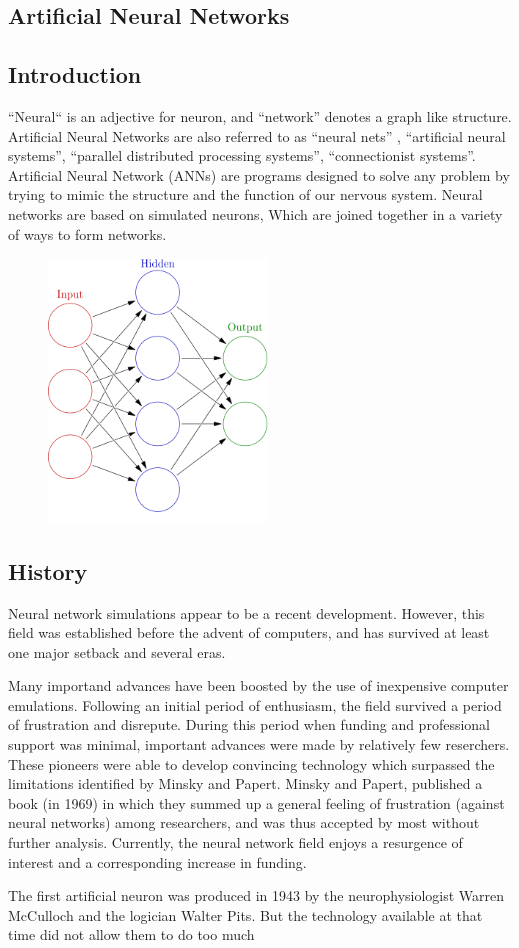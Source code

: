 \documentclass[12pt,times,a4paper]{report}
\begin{document}
{{\begin{normalsize}
\chapter{\fontsize{16}{14}\textbf{Artificial Neural Networks\hfill}}
\section{Introduction}
\par
“Neural“ is an adjective for neuron, and “network” denotes a graph like structure.
Artificial Neural Networks are also referred to as “neural nets” , “artificial neural systems”, “parallel distributed processing systems”, “connectionist systems”.
Artificial Neural Network (ANNs) are programs designed to solve any problem by trying to mimic the structure and the function of our nervous system.
Neural networks are based on simulated neurons, Which are joined together in a variety of ways to form networks.
\begin{figure}[H]
\includegraphics[height=7cm,center]{neural.png}
\caption{}
\end{figure}
\newpage
\section{History}
Neural network simulations appear to be a recent development. However, this field was
established before the advent of computers, and has survived at least one major setback and
several eras. 
\par
Many importand advances have been boosted by the use of inexpensive computer emulations.
Following an initial period of enthusiasm, the field survived a period of frustration and disrepute.
During this period when funding and professional support was minimal, important advances
were made by relatively few reserchers. These pioneers were able to develop convincing
technology which surpassed the limitations identified by Minsky and Papert. Minsky and Papert,
published a book (in 1969) in which they summed up a general feeling of frustration (against
neural networks) among researchers, and was thus accepted by most without further analysis.
Currently, the neural network field enjoys a resurgence of interest and a corresponding increase
in funding. 
\par
The first artificial neuron was produced in 1943 by the neurophysiologist Warren McCulloch and
the logician Walter Pits. But the technology available at that time did not allow them to do too
much


\end{normalsize}}}
\end{document}
